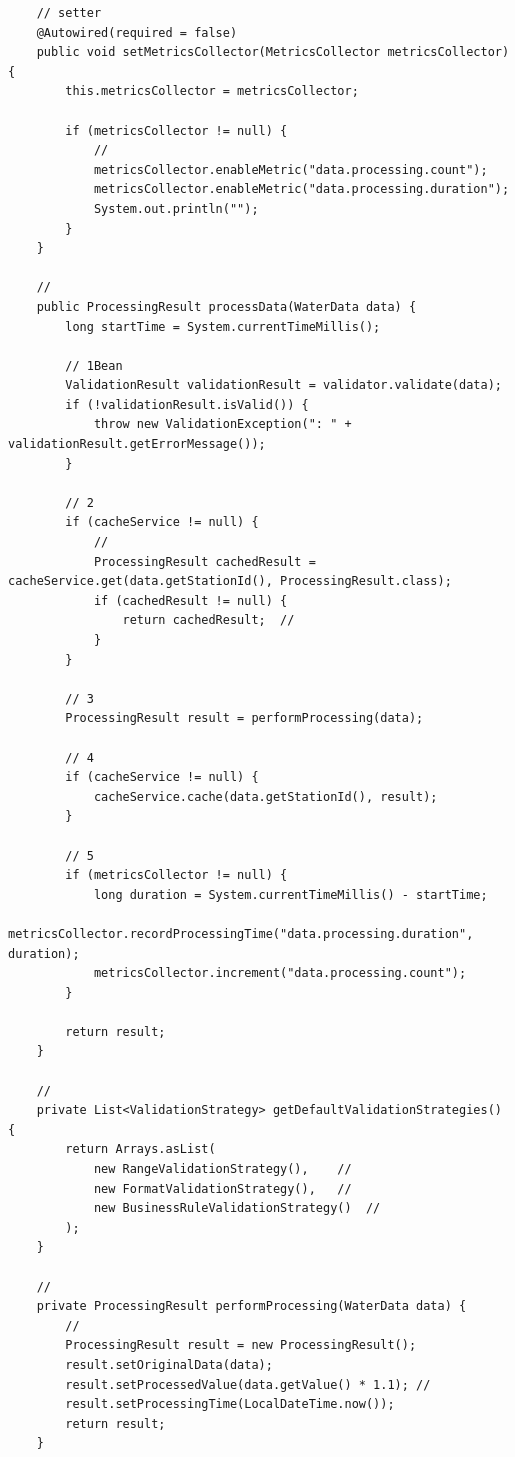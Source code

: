 \begin{verbatim}
    // setter
    @Autowired(required = false)
    public void setMetricsCollector(MetricsCollector metricsCollector) {
        this.metricsCollector = metricsCollector;
        
        if (metricsCollector != null) {
            // 
            metricsCollector.enableMetric("data.processing.count");
            metricsCollector.enableMetric("data.processing.duration");
            System.out.println("");
        }
    }
    
    // 
    public ProcessingResult processData(WaterData data) {
        long startTime = System.currentTimeMillis();
        
        // 1Bean
        ValidationResult validationResult = validator.validate(data);
        if (!validationResult.isValid()) {
            throw new ValidationException(": " + validationResult.getErrorMessage());
        }
        
        // 2
        if (cacheService != null) {
            // 
            ProcessingResult cachedResult = cacheService.get(data.getStationId(), ProcessingResult.class);
            if (cachedResult != null) {
                return cachedResult;  // 
            }
        }
        
        // 3
        ProcessingResult result = performProcessing(data);
        
        // 4
        if (cacheService != null) {
            cacheService.cache(data.getStationId(), result);
        }
        
        // 5
        if (metricsCollector != null) {
            long duration = System.currentTimeMillis() - startTime;
            metricsCollector.recordProcessingTime("data.processing.duration", duration);
            metricsCollector.increment("data.processing.count");
        }
        
        return result;
    }
    
    // 
    private List<ValidationStrategy> getDefaultValidationStrategies() {
        return Arrays.asList(
            new RangeValidationStrategy(),    // 
            new FormatValidationStrategy(),   // 
            new BusinessRuleValidationStrategy()  // 
        );
    }
    
    // 
    private ProcessingResult performProcessing(WaterData data) {
        // 
        ProcessingResult result = new ProcessingResult();
        result.setOriginalData(data);
        result.setProcessedValue(data.getValue() * 1.1); // 
        result.setProcessingTime(LocalDateTime.now());
        return result;
    }
    

\end{verbatim}
